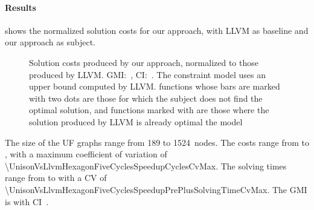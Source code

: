 \paragraph{Results}



 shows the normalized \gls{solution} costs
for our approach, with \gls{LLVM} as \gls{baseline} and our approach as
\gls{subject}.
%
\begin{figure}
  \centering%
  \maxsizebox{\textwidth}{!}{%
    \trimBarchartPlot{%
    }%
  }

  \caption[Plot for evaluating the impact of our approach on code quality]%
          {%
            Solution costs produced by our approach, normalized to those
            produced by LLVM.
            GMI:~\printGMI{%
              \UnisonVsLlvmHexagonFiveCyclesSpeedupCyclesRegularSpeedupGmean%
            },
            CI:~\printGMICI{%
              \UnisonVsLlvmHexagonFiveCyclesSpeedupCyclesRegularSpeedupCiMin%
            }{%
              \UnisonVsLlvmHexagonFiveCyclesSpeedupCyclesRegularSpeedupCiMax%
            }.
            The constraint model uses an upper bound computed by LLVM.
            \Glspl{function} whose bars are marked with two dots are those for
            which the \gls{subject} does not find the optimal solution, and
            \glspl{function} marked with \barValueNoSolution{} are those where
            the solution produced by \gls{LLVM} is already optimal \wrt the
            model%
          }
\end{figure}
%
The size of the \glspl{UF graph} range from \num{189} to
\num{1524}~\glspl{node}.
%
The costs range from
\printCycles{\UnisonVsLlvmHexagonFiveCyclesSpeedupCyclesAvgMin} to
\printCycles{\UnisonVsLlvmHexagonFiveCyclesSpeedupCyclesAvgMax}, with a maximum
coefficient of variation of
\num{\UnisonVsLlvmHexagonFiveCyclesSpeedupCyclesCvMax}.
%
The solving times range from
\printSolvingTime{\UnisonVsLlvmHexagonFiveCyclesSpeedupPrePlusSolvingTimeAvgMin}
to
\printSolvingTime{\UnisonVsLlvmHexagonFiveCyclesSpeedupPrePlusSolvingTimeAvgMax}
with a \gls{CV} of
\num{\UnisonVsLlvmHexagonFiveCyclesSpeedupPrePlusSolvingTimeCvMax}.
%
The \gls{GMI} is \printGMI{%
  \UnisonVsLlvmHexagonFiveCyclesSpeedupCyclesRegularSpeedupGmean%
} with \gls{CI}~\printGMICI{%
  \UnisonVsLlvmHexagonFiveCyclesSpeedupCyclesRegularSpeedupCiMin%
}{%
  \UnisonVsLlvmHexagonFiveCyclesSpeedupCyclesRegularSpeedupCiMax%
}.

